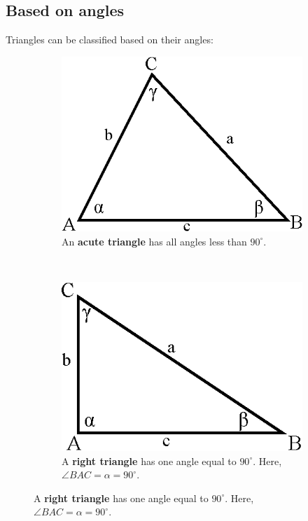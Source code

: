 \documentclass[11pt]{article}
\begin{document}
\subsection{Based on angles}
Triangles can be classified based on their angles:
\begin{figure}[!htbp]
    \centering
    \begin{subfigure}[t]{0.3\textwidth}
        \centering
        \includegraphics[scale=0.7]{triangle_basics.eps}
        \caption{An \textbf{acute triangle} has all angles less than $90^\circ$.}
    \end{subfigure}
    ~
    \begin{subfigure}[t]{0.3\textwidth}
        \centering
        \includegraphics[scale=0.7]{right_triangle.eps}
        \caption{A \textbf{right triangle} has one angle equal to $90^\circ$. Here, $\angle BAC = \alpha = 90^\circ$.}
        \label{fig:right_triangle}
    \end{subfigure}%

\end{figure}
\end{document}
